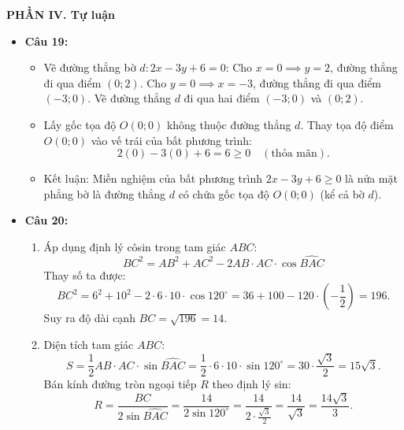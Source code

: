 \documentclass[12pt,a4paper]{article}
\begin{document}
\vspace{0.15cm}
\textbf{PHẦN IV. Tự luận}
\begin{itemize}[leftmargin=0.6cm, itemsep=2pt, topsep=1pt]
    \item \textbf{Câu 19:}
    \begin{itemize}[itemsep=1pt]
        \item Vẽ đường thẳng bờ $d: 2x - 3y + 6 = 0$:
        Cho $x = 0 \implies y = 2$, đường thẳng đi qua điểm $(0; 2)$.
        Cho $y = 0 \implies x = -3$, đường thẳng đi qua điểm $(-3; 0)$.
        Vẽ đường thẳng $d$ đi qua hai điểm $(-3; 0)$ và $(0; 2)$.
        \item Lấy gốc tọa độ $O(0; 0)$ không thuộc đường thẳng $d$.
        Thay tọa độ điểm $O(0; 0)$ vào vế trái của bất phương trình:
        \[
        2(0) - 3(0) + 6 = 6 \ge 0 \quad (\text{thỏa mãn}).
        \]
        \item Kết luận: Miền nghiệm của bất phương trình $2x - 3y + 6 \ge 0$ là nửa mặt phẳng bờ là đường thẳng $d$ có chứa gốc tọa độ $O(0; 0)$ (kể cả bờ $d$).
    \end{itemize}

    \item \textbf{Câu 20:}
    \begin{enumerate}[label=\alph*), itemsep=1pt]
        \item Áp dụng định lý côsin trong tam giác $ABC$:
        \[
        BC^2 = AB^2 + AC^2 - 2 AB \cdot AC \cdot \cos \widehat{BAC}
        \]
        Thay số ta được:
        \[
        BC^2 = 6^2 + 10^2 - 2 \cdot 6 \cdot 10 \cdot \cos 120^\circ = 36 + 100 - 120 \cdot \left(-\dfrac{1}{2}\right) = 196.
        \]
        Suy ra độ dài cạnh $BC = \sqrt{196} = 14$.
        \item Diện tích tam giác $ABC$:
        \[
        S = \dfrac{1}{2} AB \cdot AC \cdot \sin \widehat{BAC} = \dfrac{1}{2} \cdot 6 \cdot 10 \cdot \sin 120^\circ = 30 \cdot \dfrac{\sqrt{3}}{2} = 15\sqrt{3}.
        \]
        Bán kính đường tròn ngoại tiếp $R$ theo định lý sin:
        \[
        R = \dfrac{BC}{2\sin \widehat{BAC}} = \dfrac{14}{2 \sin 120^\circ} = \dfrac{14}{2 \cdot \frac{\sqrt{3}}{2}} = \dfrac{14}{\sqrt{3}} = \dfrac{14\sqrt{3}}{3}.
        \]
    \end{enumerate}


\end{itemize}
\end{document}
